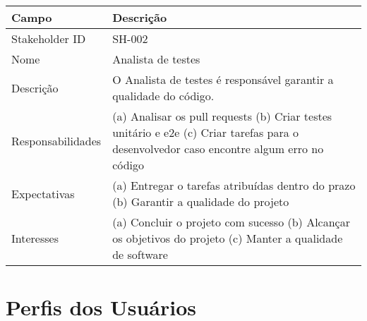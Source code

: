 \begin{table}[htbp]
\begin{tabularx}{\textwidth}{lX}
\hline
Campo             & Descrição                                                                                                                                                                           \\ \hline
Stakeholder ID    & SH-002                                                                                                                                                                              \\ \hline
Nome              & Analista de testes                                                                                                                                                                       \\ \hline
Descrição         & O Analista de testes é responsável garantir a qualidade do código.                                                                                                  \\ \hline
Responsabilidades & (a) Analisar os pull requests (b) Criar testes unitário e e2e (c) Criar tarefas para o desenvolvedor caso encontre algum erro no código \\ \hline
Expectativas      & (a) Entregar o tarefas atribuídas dentro do prazo (b) Garantir a qualidade do projeto                                                                                   \\ \hline
Interesses        & (a) Concluir o projeto com sucesso (b) Alcançar os objetivos do projeto (c) Manter a qualidade de software                                                                           \\ \hline

\end{tabularx}
\end{table}   

\section{Perfis dos Usuários}

